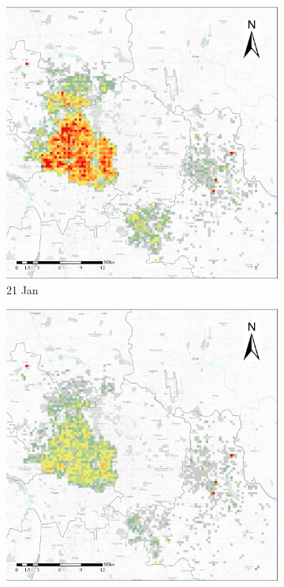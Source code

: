 \documentclass[preprints,ijgi,submit,moreauthors]{Definitions/mdpi}
\begin{document}
\begin{figure}[H]
    \centering
    \begin{subfigure}{.23\textwidth}
        \includegraphics[width=\textwidth]{Figures/Overall_spatial_patterns/FN5_D2020_01_21.eps}
        \caption{21 Jan}
    \end{subfigure}
    \begin{subfigure}{.23\textwidth}
        \includegraphics[width=\textwidth]{Figures/Overall_spatial_patterns/FN5_D2020_01_25.eps}

\end{subfigure}
\end{figure}
\end{document}
